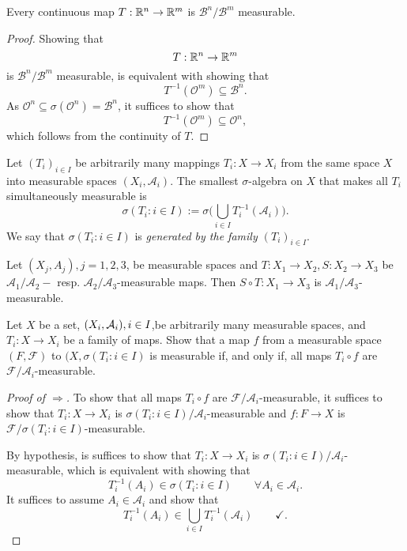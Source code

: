 \begin{thm}
Every continuous map \(T:\Bbb{R}^n\rightarrow \Bbb{R}^m\) is \(\mathcal{B}^n/\mathcal{B}^m\) measurable.
\end{thm}

\begin{proof}
Showing that
\[
T:\Bbb{R}^n\rightarrow \Bbb{R}^m
\]
is \(\mathcal{B}^n/\mathcal{B}^m\) measurable, is equivalent with showing that
\[
T^{-1}(\mathcal{O}^m)\subseteq \mathcal{B}^n.
\]
As \(\mathcal{O}^n\subseteq \sigma (\mathcal{O}^n)= \mathcal{B}^n\), it suffices to show that
\[
T^{-1}(\mathcal{O}^m)\subseteq \mathcal{O}^n,
\]
which follows from the continuity of \(T\).
\end{proof}

\begin{defn}
Let \((T_{i})_{i\in I}\) be arbitrarily many mappings \(T_{i}:X\rightarrow X_{i}\) from the same space \(X\) into measurable spaces \((X_{i},\mathcal{A}_{i})\). The smallest \(\sigma \)-algebra on \(X\) that makes all \(T_{i}\) simultaneously measurable is
\[
\sigma (T_{i}:i\in I):=\sigma \Big(\bigcup _{i\in I}T_{i}^{-1}(\mathcal{A}_{i})\Big).
\]
We say that \(\sigma (T_{i}:i\in I)\) is \emph{generated by the family \((T_{i})_{i\in I}\)}.
\end{defn}

\begin{thm}
Let \((X_{j},A_{j}),j=1,2,3\), be measurable spaces and \(T:X_{1}\rightarrow X_{2},S:X_{2}\rightarrow X_{3}\) be \(\mathcal{A}_{1}/\mathcal{A}_{2}-\) resp. \(\mathcal{A}_{2}/\mathcal{A}_{3}\)-measurable maps. Then \(S\circ T:X_{1}\rightarrow X_{3}\) is \(\mathcal{A}_{1}/\mathcal{A}_{3}\)-measurable.
\end{thm}
\newpage
\begin{thm}[Problem 7.4]
Let \(X\) be a set, \((X_{i},\mathcal{A}_{i}),\space i\in I\),be arbitrarily many measurable spaces, and \(T_{i}:X\rightarrow X_{i}\) be a family of maps. Show that a map \(f\) from a measurable space \((F,\mathcal{F})\) to \((X,\sigma (T_{i}:i\in I)\) is measurable if, and only if, all maps \(T_{i}\circ f\) are \(\mathcal{F}/\mathcal{A}_{i}\)-measurable.
\end{thm}

\begin{proof}[Proof of $\Longrightarrow$]
To show that all maps \(T_{i}\circ f\) are \(\mathcal{F}/\mathcal{A}_{i}\)-measurable, it suffices to show that \(T_{i}:X\rightarrow X_{i}\) is \(\sigma (T_{i}:i\in I)/\mathcal{A}_{i}\)-measurable and \(f:F\rightarrow X\) is \(\mathcal{F}/\sigma (T_{i}:i\in I)\)-measurable.

By hypothesis, is suffices to show that \(T_{i}:X\rightarrow X_{i}\) is \(\sigma (T_{i}:i\in I)/\mathcal{A}_{i}\)-measurable, which is equivalent with showing that
\[
T_{i}^{-1}(A_{i})\in \sigma (T_{i}:i\in I)\qquad \forall A_{i}\in \mathcal{A}_{i}.
\]
It suffices to assume \(A_{i}\in \mathcal{A}_{i}\) and show that
\[
T_{i}^{-1}(A_{i})\in \bigcup _{i\in I}T_{i}^{-1}(\mathcal{A}_{i}) \qquad \checkmark.
\]
\end{proof}

